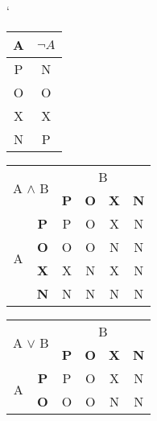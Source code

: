\documentclass[a4paper, 11pt]{article}
\begin{document}
\begin{table}[h]
	\centering
	\catcode`
	\begin{tabular}{|c|c|}
		\hline
		\multicolumn{1}{|c|}{A} & $\neg A$ \\
		\hline
		P                       & N        \\
		\hline
		O                       & O        \\
		\hline
		X                       & X        \\
		\hline
		N                       & P        \\
		\hline
	\end{tabular}
	\begin{tabular}{|c|c|c|c|c|c|}
		\hline
		\multicolumn{2}{|c|}{\multirow{2}{*}{A $\land$ B}} & \multicolumn{4}{c|}{B}                                            \\ \cline{3-6}
		\multicolumn{2}{|c|}{}                             & \textbf{P}             & \textbf{O} & \textbf{X} & \textbf{N}     \\ \hline
		\multirow{4}{*}{A}                                 & \textbf{P}             & P          & O          & X          & N \\ \cline{2-6}
		                                                   & \textbf{O}             & O          & O          & N          & N \\ \cline{2-6}
		                                                   & \textbf{X}             & X          & N          & X          & N \\ \cline{2-6}
		                                                   & \textbf{N}             & N          & N          & N          & N \\ \hline
	\end{tabular}
	\begin{tabular}{|c|c|c|c|c|c|}
		\hline
		\multicolumn{2}{|c|}{\multirow{2}{*}{A $\lor$ B}} & \multicolumn{4}{c|}{B}                                            \\ \cline{3-6}
		\multicolumn{2}{|c|}{}                            & \textbf{P}             & \textbf{O} & \textbf{X} & \textbf{N}     \\ \hline
		\multirow{4}{*}{A}                                & \textbf{P}             & P          & O          & X          & N \\ \cline{2-6}
		                                                  & \textbf{O}             & O          & O          & N          & N \\ \cline{2-6}

\end{tabular}
\end{table}
\end{document}
